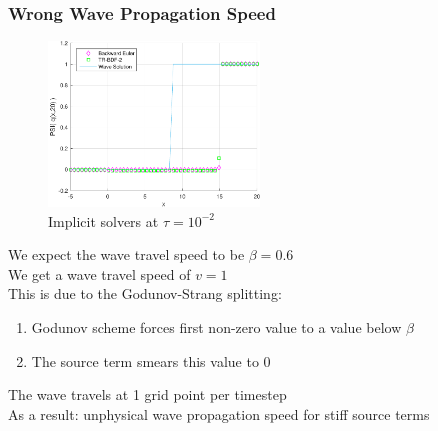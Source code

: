 \begin{frame}{}
    \frametitle{Wrong Wave Propagation Speed}
    \vspace{1cm}
    \begin{multicols}{2}
        \begin{figure}
            \centering
            \includegraphics[width=0.5\textwidth]{figures/goombiwampi.pdf}
            \caption{Implicit solvers at $\tau=10^{-2}$}
            \label{fig:chupachups}
        \end{figure}{}
        \vfill\null
        \columnbreak  \pause
        We expect the wave travel speed to be $\beta=0.6$ \\
        We get a wave travel speed of $v=1$ \\
        This is due to the Godunov-Strang splitting: \\
        \begin{enumerate}
            \item Godunov scheme forces first non-zero value to a value below $\beta$
            \item The source term smears this value to 0
        \end{enumerate}
        The wave travels at 1 grid point per timestep \\
        As a result: unphysical wave propagation speed for stiff source terms
    \end{multicols}{}
\end{frame}{}


